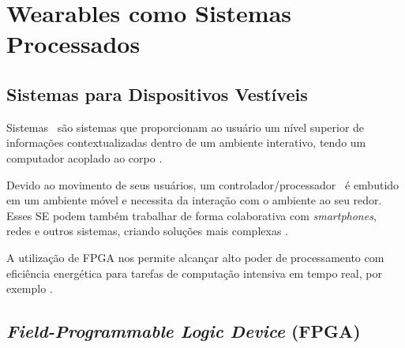 \section{Wearables como Sistemas Processados} \label{chap:revisao_bibliografica}
   \subsection{Sistemas para Dispositivos Vestíveis}
      
      Sistemas \wearables\ são sistemas que proporcionam ao usuário um nível superior de informações contextualizadas dentro de um ambiente interativo, tendo um computador acoplado ao corpo \cite{Amorim2017}.


      Devido ao movimento de seus usuários, um controlador/processador \wearable\ é embutido em um ambiente móvel e necessita da interação com o ambiente ao seu redor.
      Esses SE podem também trabalhar de forma colaborativa com \textit{smartphones}, redes e outros sistemas, criando soluções mais complexas \cite{Jozwiak2017}.

      A utilização de FPGA nos permite alcançar alto poder de processamento com eficiência energética para tarefas de computação intensiva em tempo real, por exemplo \cite{Plessl2003}.


   \subsection{\textit{Field-Programmable Logic Device} (FPGA)}

